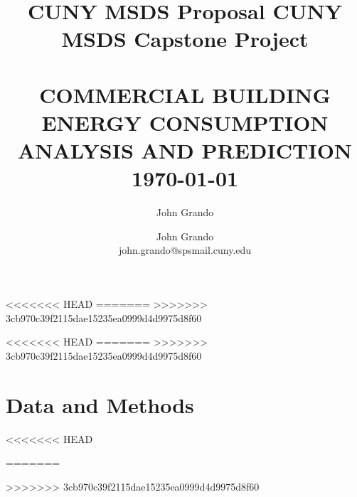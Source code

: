 \documentclass[12pt,letterpaper]{article}
\author{John Grando}
\title{CUNY MSDS Proposal}
\title{	\Large { CUNY MSDS Capstone Project} 	%
		 	\\[2.0cm]								%
			\HRule{2pt} \\						%
			\LARGE \textbf{\uppercase{Commercial Building Energy Consumption}} \\ [0.25in] \Large \textbf{\uppercase{Analysis and Prediction}}	%
			\HRule{2pt} \\ [0.5cm]		%
			\Large \today			%
		}
\author{
		John Grando\\	
        john.grando@spsmail.cuny.edu \\
}
\makeatletter
\def\printtitle{%
    {\centering \@title\par}}
\def\printauthor{%
    {\centering \Large \@author}}
\makeatother
\begin{document}
<<<<<<< HEAD
=======
>>>>>>> 3cb970c39f2115dae15235ea0999d4d9975d8f60
\thispagestyle{empty}		%
\printtitle					%
  	\vfill
\printauthor				%
\newpage
\setcounter{secnumdepth}{-1}
{\hypersetup{linkcolor =black}
  \tableofcontents
  }
\newpage
\setcounter{page}{1}		%
<<<<<<< HEAD
=======
>>>>>>> 3cb970c39f2115dae15235ea0999d4d9975d8f60




\section{Data and Methods}



<<<<<<< HEAD

=======




>>>>>>> 3cb970c39f2115dae15235ea0999d4d9975d8f60
\newpage

\end{document}
